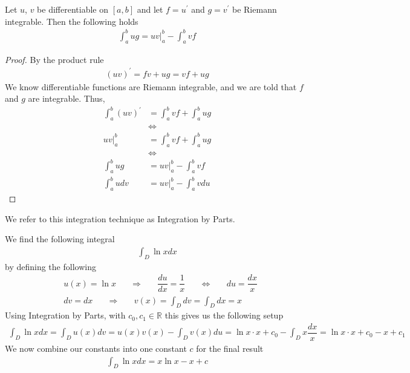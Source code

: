 \begin{theorem}
Let $u$, $v$ be differentiable on $[a, b]$ and let $f = u^{'}$ and $g = v^{'}$ be Riemann integrable. Then the following holds
\begin{align*}
    \int_{a}^{b} ug = uv \Big|_{a}^{b} - \int_{a}^{b} vf
\end{align*}
\begin{proof}
By the product rule
\begin{align*}
    (uv)^{'} = fv + ug = vf + ug
\end{align*}
We know differentiable functions are Riemann integrable, and we are told that $f$ and $g$ are integrable. Thus,
\begin{align*}
    \int_{a}^{b} (uv)^{'} &= \int_{a}^{b} vf + \int_{a}^{b} ug\\[2ex]
    &\Longleftrightarrow\\[2ex]
    uv \Big|_{a}^{b} &= \int_{a}^{b} vf + \int_{a}^{b} ug\\[2ex] 
    &\Longleftrightarrow\\[2ex]
    \int_{a}^{b} ug &= uv \Big|_{a}^{b} - \int_{a}^{b} vf\\[2ex]
    \int_{a}^{b} u dv &= uv \Big|_{a}^{b} - \int_{a}^{b} v du
\end{align*}
\end{proof}
We refer to this integration technique as Integration by Parts.
\end{theorem}

\begin{example}
We find the following integral
\begin{align*}
    \int_{D} \ln x dx
\end{align*}
by defining the following
\begin{align*}
    &u(x) = \ln x \hspace{20pt} \Longrightarrow \hspace{20pt} \dfrac{du}{dx} = \dfrac{1}{x} \hspace{20pt} \Longleftrightarrow \hspace{20pt} du = \dfrac{dx}{x}\\[2ex]
    &dv = dx \hspace{20pt} \Longrightarrow \hspace{20pt} v(x) = \int_{D} dv = \int_{D} dx = x
\end{align*}
Using Integration by Parts, with $c_{0}, c_{1} \in \mathbb{R}$ this gives us the following setup
\begin{align*}
    \int_{D} \ln x dx = \int_{D} u(x) dv = u(x)v(x) - \int_{D} v(x) du = \ln x \cdot x + c_{0} - \int_{D} x \dfrac{dx}{x} = \ln x \cdot x + c_{0} - x + c_{1}
\end{align*}
We now combine our constants into one constant $c$ for the final result
\begin{align*}
    \int_{D} \ln x dx = x \ln x - x + c
\end{align*}
\end{example}

